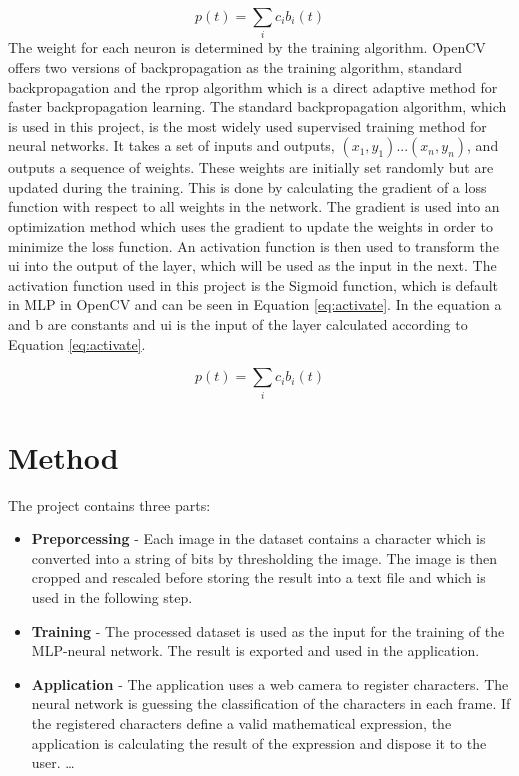 \documentclass[12pt]{report}
\begin{document}
\begin{equation}
  \label{eq:weight}
  p(t) = \sum_i c_ib_i(t) %
\end{equation}
The weight for each neuron is determined by the training algorithm. OpenCV offers two versions of backpropagation as the training algorithm, standard backpropagation and the rprop algorithm which is a direct adaptive method for faster backpropagation learning. The standard backpropagation algorithm, which is used in this project, is the most widely used supervised training method for neural networks. It takes a set of inputs and outputs, $(x_1, y_1)...(x_n,y_n)$, and outputs a sequence of weights. These weights are initially set randomly but are updated during the training. This is done by calculating the gradient of a loss function with respect to all weights in the network. The gradient is used into an optimization method which uses the gradient to update the weights in order to minimize the loss function. 
\newline
\newline
An activation function is then used to transform the ui into the output of the layer, which will be used as the input in the next. The activation function used in this project is the Sigmoid function, which is default in MLP in OpenCV and can be seen in Equation \ref{eq:activate}. In the equation a and b are constants and ui is the input of the layer calculated according to Equation \ref{eq:activate}.


\begin{equation}
  \label{eq:activate}
  p(t) = \sum_i c_ib_i(t) %
\end{equation}



\section*{Method}

The project contains three parts:

\begin{itemize}  
\item \textbf{Preporcessing} -  Each image in the dataset contains a character which is converted into a string of bits by thresholding the image. The image is then cropped and rescaled before storing the result into a text file and which is used in the following step. 
\item \textbf{Training} - The processed dataset is used as the input for the training of the MLP-neural network. The result is exported and used in the application.
\item \textbf{Application} - The application uses a web camera to register characters. The neural network is guessing the classification of the characters in each frame. If the registered characters define a valid mathematical expression, the application is calculating the result of the expression and dispose it to the user. \ldots 
\end{itemize}
\end{document}
